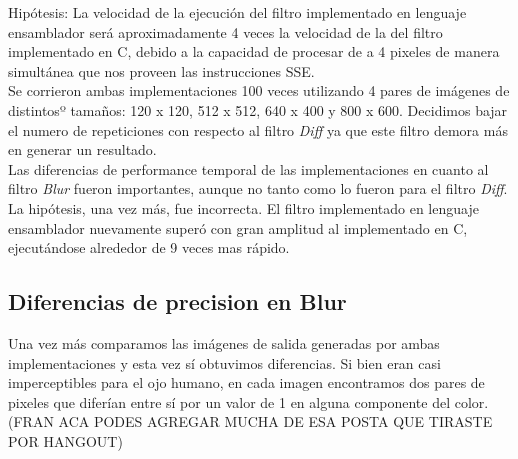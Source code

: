 \documentclass[10pt,a4paper,spanish]{article}
\begin{document}
Hipótesis: La velocidad de la ejecución del filtro implementado en lenguaje ensamblador será aproximadamente 4 veces la velocidad de la del filtro implementado en C, debido a la capacidad de procesar de a 4 pixeles de manera simultánea que nos proveen las instrucciones SSE. \\

Se corrieron ambas implementaciones 100 veces utilizando 4 pares de imágenes de distintosº tamaños: 120 x 120, 512 x 512, 640 x 400 y 800 x 600. Decidimos bajar el numero de repeticiones con respecto al filtro \textit{Diff} ya que este filtro demora más en generar un resultado.\\

Las diferencias de performance temporal de las implementaciones en cuanto al filtro \textit{Blur} fueron importantes, aunque no tanto como lo fueron para el filtro \textit{Diff}. La hipótesis, una vez más, fue incorrecta. El filtro implementado en lenguaje ensamblador nuevamente superó con gran amplitud al implementado en C, ejecutándose alrededor de 9 veces mas rápido. \\


\subsection{Diferencias de precision en Blur}

Una vez más comparamos las imágenes de salida generadas por ambas implementaciones y esta vez sí obtuvimos diferencias. Si bien eran casi imperceptibles para el ojo humano, en cada imagen encontramos dos pares de pixeles que diferían entre sí por un valor de 1 en alguna componente del color. (FRAN ACA PODES AGREGAR MUCHA DE ESA POSTA QUE TIRASTE POR HANGOUT)
\end{document}
